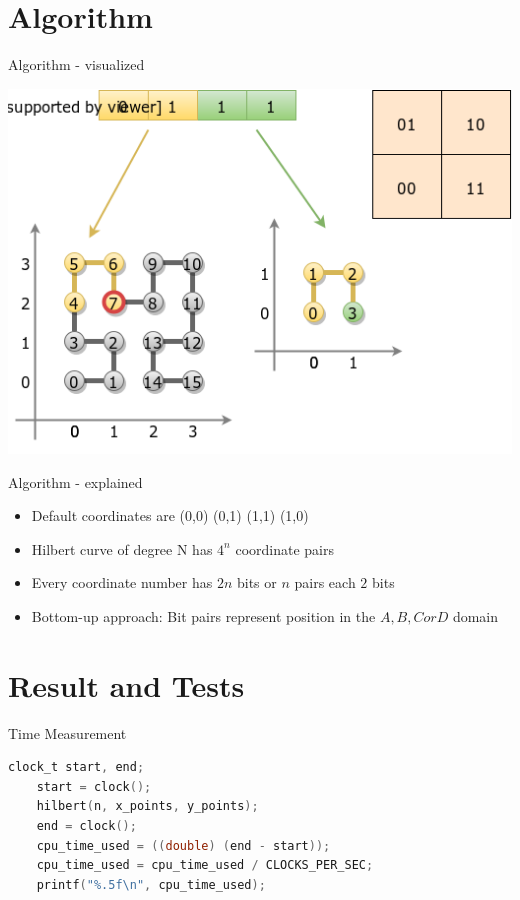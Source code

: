 \documentclass[12pt]{beamer}
\begin{document}
\section{Algorithm}


\begin{frame}[fragile]{Algorithm - visualized}
    \begin{center}
        \includegraphics[width=\textwidth,height=0.8\textheight,keepaspectratio]
        {../img/algorithm.png}
    \end{center}
\end{frame}

\begin{frame}[fragile]{Algorithm - explained}
    \begin{itemize}
\item     Default coordinates are (0,0) (0,1) (1,1) (1,0)
\item     Hilbert curve of degree N has $4^n$ coordinate pairs
\item     Every coordinate number has $2n$ bits or $n$ pairs each  $2$ bits
\item     Bottom-up approach: Bit pairs represent position in the $A, B, C or D$ domain
    \end{itemize}
\end{frame}

\section{Result and Tests}

\begin{frame}[fragile]{Time Measurement}
\begin{lstlisting}[language=c]
    clock_t start, end;
    start = clock();
    hilbert(n, x_points, y_points);
    end = clock();
    cpu_time_used = ((double) (end - start));
    cpu_time_used = cpu_time_used / CLOCKS_PER_SEC;
    printf("%.5f\n", cpu_time_used);
\end{lstlisting}
\end{frame}
\end{document}
